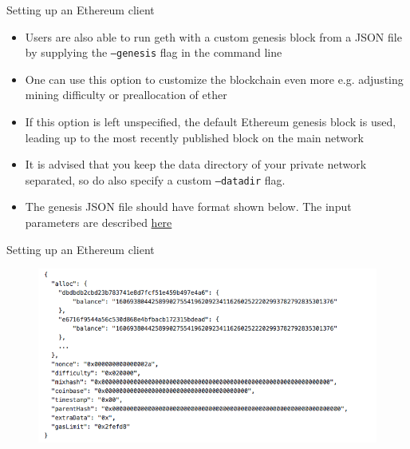 \documentclass[11pt]{beamer}
\begin{document}

\begin{frame}{Setting up an Ethereum client}
	\begin{itemize}
		\item Users are also able to run geth with a custom genesis block from a JSON file by supplying the \texttt{---genesis} flag in the command line
		\item  One can use this option to customize the blockchain even more e.g. adjusting mining difficulty or preallocation of ether
		\item If this option is left unspecified, the default Ethereum genesis block is used, leading up to the most recently published block on the main network
		\item It is advised that you keep the data directory of your private network separated, so do also specify a custom \texttt{---datadir} flag.
		\item The genesis JSON file should have format shown below. The input parameters are described \href{https://github.com/qobolwakhe/MSc2018/wiki/Genesis-Block}{here}
	\end{itemize}
\end{frame}


\begin{frame}{Setting up an Ethereum client}
		\begin{figure}[]
			\centering
			\includegraphics  [scale=0.4]{Images/geth2}
		\end{figure}
\end{frame}

\end{document}
